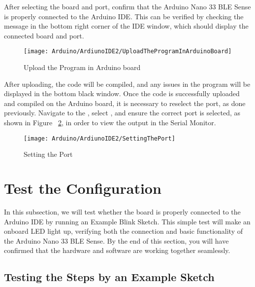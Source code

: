 After selecting the board and port, confirm that the Arduino Nano 33 BLE Sense is properly connected to the Arduino IDE. This can be verified by checking the message in the bottom right corner of the IDE window, which should display the connected board and port.





\begin{figure}[H]\centering
	\texttt{[image: Arduino/ArdiunoIDE2/UploadTheProgramInArduinoBoard]}
	\caption{Upload the Program in Arduino board}
	\label{fig:Upload the Program in Arduino board}		
\end{figure}




After uploading, the code will be compiled, and any issues in the program will be displayed in the bottom black window. Once the code is successfully uploaded and compiled on the Arduino board, it is necessary to reselect the port, as done previously. Navigate to the , select , and ensure the correct port is selected, as shown in Figure ~\ref{fig:SettingthePort}, in order to view the output in the Serial Monitor.



\begin{figure}[H]\centering
	\texttt{[image: Arduino/ArdiunoIDE2/SettingThePort]}
	\caption{Setting the Port}
	\label{fig:SettingthePort}		
\end{figure} 





\section{Test the Configuration}

In this subsection, we will test whether the board is properly connected to the Arduino IDE by running an Example Blink Sketch. This simple test will make an onboard LED light up, verifying both the connection and basic functionality of the Arduino Nano 33 BLE Sense. By the end of this section, you will have confirmed that the hardware and software are working together seamlessly.


\subsection{Testing the Steps by an Example Sketch }


